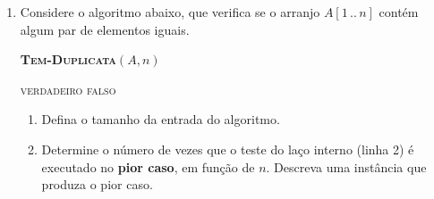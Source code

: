 \documentclass[9pt,a4paper]{extarticle}
\begin{document}
\begin{enumerate}[resume]
    \begin{enumerate}
        \item Defina o tamanho da entrada do algoritmo.
        \item Monte a tabela de custos no estilo CLRS. Use $t$ para denotar o número de vezes que o teste do laço \textbf{while} (linha 2) é avaliado, e expresse o número de execuções das linhas 2 e 3 em função de $t$.
        \item Escreva $T(n)$ em função dos custos $c_i$ e de $t$.
        \item \textbf{Melhor caso:} qual é o valor de $t$? Descreva uma instância que produza esse caso e mostre que $T_{\text{melhor}}(n) = \Theta(1)$.
        \item \textbf{Pior caso:} qual é o valor de $t$? Descreva todas as instâncias (em função de $A$ e $x$) que produzem esse caso e mostre que $T_{\text{pior}}(n) = \Theta(n)$.
        \item \textbf{Caso médio:} suponha que $x$ ocorra exatamente uma vez em $A$ e que a probabilidade de $x$ estar em qualquer posição $i \in \{1, 2, \dots, n\}$ seja uniforme. Calcule $\mathbb{E}[t]$ e mostre que $T_{\text{med}}(n) = \Theta(n)$.
    \end{enumerate}

    \item Considere o algoritmo abaixo, que verifica se o arranjo $A[1\,..\,n]$ contém algum par de elementos iguais.

    \begin{center}
    \begin{minipage}{0.65\textwidth}
    \textbf{\textsc{Tem-Duplicata}}$(A, n)$
    \begin{algorithmic}[1]
                    \State \Return \textsc{verdadeiro}
                \EndIf
            \EndFor
        \EndFor
        \State \Return \textsc{falso}
    \end{algorithmic}
    \end{minipage}
    \end{center}

    \begin{enumerate}
        \item Defina o tamanho da entrada do algoritmo.
        \item Determine o número de vezes que o teste do laço interno (linha 2) é executado no \textbf{pior caso}, em função de $n$. Descreva uma instância que produza o pior caso.


\end{enumerate}
\end{enumerate}
\end{document}
